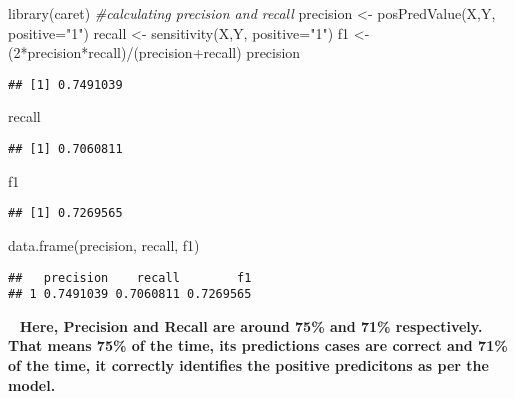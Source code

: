 \documentclass[
]{article}
\newenvironment{Shaded}{\begin{snugshade}}{\end{snugshade}}
\newcommand{\AttributeTok}[1]{\textcolor[rgb]{0.77,0.63,0.00}{#1}}
\newcommand{\CommentTok}[1]{\textcolor[rgb]{0.56,0.35,0.01}{\textit{#1}}}
\newcommand{\DecValTok}[1]{\textcolor[rgb]{0.00,0.00,0.81}{#1}}
\newcommand{\FunctionTok}[1]{\textcolor[rgb]{0.00,0.00,0.00}{#1}}
\newcommand{\NormalTok}[1]{#1}
\newcommand{\OtherTok}[1]{\textcolor[rgb]{0.56,0.35,0.01}{#1}}
\newcommand{\SpecialCharTok}[1]{\textcolor[rgb]{0.00,0.00,0.00}{#1}}
\newcommand{\StringTok}[1]{\textcolor[rgb]{0.31,0.60,0.02}{#1}}
\begin{document}
\begin{Shaded}
\begin{Highlighting}[]
\FunctionTok{library}\NormalTok{(caret)}
\CommentTok{\#calculating precision and recall}
\NormalTok{precision }\OtherTok{\textless{}{-}} \FunctionTok{posPredValue}\NormalTok{(X,Y, }\AttributeTok{positive=}\StringTok{"1"}\NormalTok{)}
\NormalTok{recall }\OtherTok{\textless{}{-}} \FunctionTok{sensitivity}\NormalTok{(X,Y, }\AttributeTok{positive=}\StringTok{"1"}\NormalTok{)}
\NormalTok{f1 }\OtherTok{\textless{}{-}}\NormalTok{ (}\DecValTok{2}\SpecialCharTok{*}\NormalTok{precision}\SpecialCharTok{*}\NormalTok{recall)}\SpecialCharTok{/}\NormalTok{(precision}\SpecialCharTok{+}\NormalTok{recall)}
\NormalTok{precision}
\end{Highlighting}
\end{Shaded}

\begin{verbatim}
## [1] 0.7491039
\end{verbatim}

\begin{Shaded}
\begin{Highlighting}[]
\NormalTok{recall}
\end{Highlighting}
\end{Shaded}

\begin{verbatim}
## [1] 0.7060811
\end{verbatim}

\begin{Shaded}
\begin{Highlighting}[]
\NormalTok{f1}
\end{Highlighting}
\end{Shaded}

\begin{verbatim}
## [1] 0.7269565
\end{verbatim}

\begin{Shaded}
\begin{Highlighting}[]
\FunctionTok{data.frame}\NormalTok{(precision, recall, f1) }
\end{Highlighting}
\end{Shaded}

\begin{verbatim}
##   precision    recall        f1
## 1 0.7491039 0.7060811 0.7269565
\end{verbatim}

~ \textbf{Here, Precision and Recall are around 75\% and 71\%
respectively. That means 75\% of the time, its predictions cases are
correct and 71\% of the time, it correctly identifies the positive
predicitons as per the model.}
\end{document}
